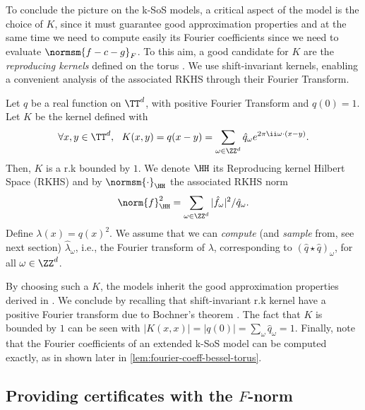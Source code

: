 \documentclass{article}
\begin{document}
To conclude the picture on the k-SoS models, a critical aspect of the model is the choice of $K$, since it must guarantee good approximation properties and at the same time we need to compute easily its Fourier coefficients since we need to evaluate $\normsm{f - c - g}_F$. To this aim, a good candidate for $K$ are the \emph{reproducing kernels} defined on the torus \cite{steinwart2008support}. We use shift-invariant kernels, enabling a convenient analysis of the associated RKHS through their Fourier Transform.

\begin{definition}\label{def:rk-torus}
  Let $q$ be a real function on $\TT^d$, with positive Fourier Transform and $q(0) = 1$. Let $K$ be the kernel defined with
  \begin{equation}\label{eq:def-kernel-torus}
    \forall x, y \in \TT^d, ~~ K(x, y) = q(x - y) = \sum_{\omega \in \ZZ^d} \hat{q}_\omega e^{2\pi \ii \omega \cdot (x - y)}.
  \end{equation}
  Then, $K$ is a r.k bounded by $1$. We denote $\HH$ its Reproducing kernel Hilbert Space (RKHS) and by $\normsm{\cdot}_{\HH}$ the associated RKHS norm
  \begin{equation*}
    \norm{f}_\HH^2 = \sum_{\omega \in \ZZ^d} |\hat{f}_\omega|^2 / \hat{q}_\omega.
  \end{equation*}
  Define $\lambda(x) = q(x)^2$. We assume that we can \emph{compute} (and \emph{sample} from, see next section) $\hat{\lambda}_\omega$, i.e., the Fourier transform of $\lambda$, corresponding to $(\hat{q} \star \hat{q})_\omega$, for all $\omega \in \ZZ^d$.
\end{definition}

By choosing such a $K$, the models inherit the good approximation properties derived in \cite{marteau-fereyNonparametricModelsNonnegative2020,rudiPSDRepresentationsEffective2021}. We conclude by recalling that shift-invariant r.k kernel have a positive Fourier transform due to Bochner's theorem \cite{rudinBasicTheoremsFourier1990}. The fact that $K$ is bounded by $1$ can be seen with $|K(x, x)| = |q(0)| = \sum_{\omega} \hat{q}_\omega = 1$. Finally, note that the Fourier coefficients of an extended k-SoS model can be computed exactly, as in shown \eg later in \cref{lem:fourier-coeff-bessel-torus}.

\subsection{Providing certificates with the \texorpdfstring{$F$}{F}-norm}
\end{document}
